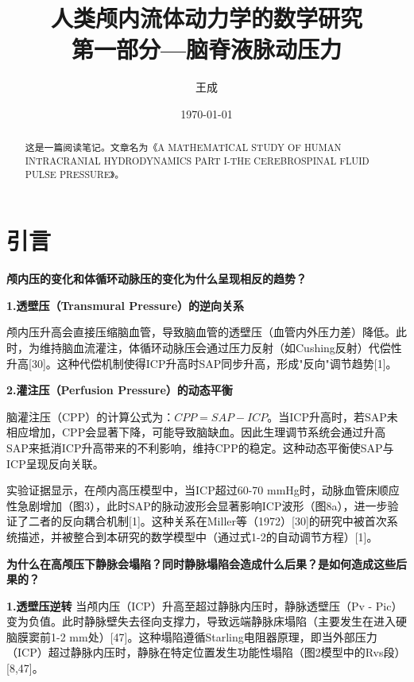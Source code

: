 \documentclass[12pt]{article}
\begin{document}
\title{人类颅内流体动力学的数学研究 \\ 第一部分—脑脊液脉动压力}
\author{王成}
\date{\today}

\maketitle

\begin{abstract}
    这是一篇阅读笔记。文章名为《A MATHEMATICAL STUDY OF HUMAN INTRACRANIAL HYDRODYNAMICS PART I-THE CEREBROSPINAL FLUID PULSE PRESSURE》。
\end{abstract}



\section{引言}
\noindent \textbf{\large 颅内压的变化和体循环动脉压的变化为什么呈现相反的趋势？}
\vspace{0.25cm}

\noindent \textbf{1.透壁压（Transmural Pressure）的逆向关系} 

颅内压升高会直接压缩脑血管，导致脑血管的透壁压（血管内外压力差）降低。此时，为维持脑血流灌注，体循环动脉压会通过压力反射（如Cushing反射）代偿性升高[30]。这种代偿机制使得ICP升高时SAP同步升高，形成"反向"调节趋势[1]。

\noindent \textbf{2.灌注压（Perfusion Pressure）的动态平衡}

脑灌注压（CPP）的计算公式为：$CPP = SAP - ICP$。当ICP升高时，若SAP未相应增加，CPP会显著下降，可能导致脑缺血。因此生理调节系统会通过升高SAP来抵消ICP升高带来的不利影响，维持CPP的稳定。这种动态平衡使SAP与ICP呈现反向关联。

实验证据显示，在颅内高压模型中，当ICP超过60-70 mmHg时，动脉血管床顺应性急剧增加（图3），此时SAP的脉动波形会显著影响ICP波形（图8a），进一步验证了二者的反向耦合机制[1]。这种关系在Miller等（1972）[30]的研究中被首次系统描述，并被整合到本研究的数学模型中（通过式1-2的自动调节方程）[1]。
\newpage

\noindent \textbf{\large 为什么在高颅压下静脉会塌陷？同时静脉塌陷会造成什么后果？是如何造成这些后果的？}
\vspace{0.25cm}


\noindent \textbf{1.透壁压逆转}
当颅内压（ICP）升高至超过静脉内压时，静脉透壁压（Pv - Pic）变为负值。此时静脉壁失去径向支撑力，导致远端静脉床塌陷（主要发生在进入硬脑膜窦前1-2 mm处）[47]。这种塌陷遵循Starling电阻器原理，即当外部压力（ICP）超过静脉内压时，静脉在特定位置发生功能性塌陷（图2模型中的Rvs段）[8,47]。
\end{document}
